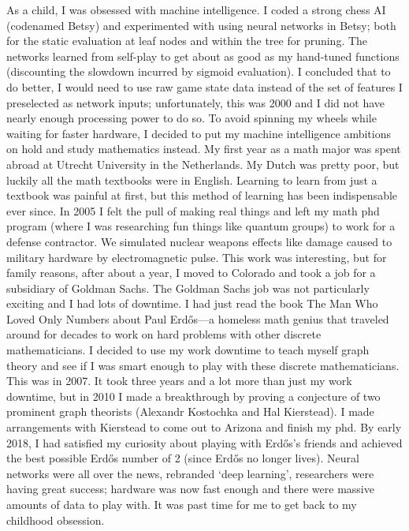 \documentclass{article}
\title{}
\author{Landon Rabern}
\begin{document}
\maketitle

As a child, I was obsessed with machine intelligence. I coded a strong chess AI (codenamed Betsy) and experimented with using neural networks in Betsy;
both for the static evaluation at leaf nodes and within the tree for pruning. 
The networks learned from self-play to get about as good as my hand-tuned functions (discounting the slowdown incurred by sigmoid evaluation). 
I concluded that to do better, I would need to use raw game state data instead of the set of features I preselected as network inputs; 
unfortunately, this was 2000 and I did not have nearly enough processing power to do so. 
To avoid spinning my wheels while waiting for faster hardware, I decided to put my machine intelligence ambitions on hold and 
study mathematics instead. My first year as a math major was spent abroad at Utrecht University in the Netherlands. My Dutch was pretty poor, 
but luckily all the math textbooks were in English. 
Learning to learn from just a textbook was painful at first, but this method of learning has been indispensable ever since. 
In 2005 I felt the pull of making real things and left my math phd program (where I was researching fun things like quantum groups) to work for a defense contractor. 
We simulated nuclear weapons effects like damage caused to military hardware by electromagnetic pulse. 
This work was interesting, but for family reasons, after about a year, I moved to Colorado and took a job for a subsidiary of Goldman Sachs.
The Goldman Sachs job was not particularly exciting and I had lots of downtime. 
I had just read the book The Man Who Loved Only Numbers about Paul Erdős---a homeless math genius that traveled around for decades to work on hard 
problems with other discrete mathematicians. I decided to use my work downtime to teach myself graph theory and see if I was smart enough to play 
with these discrete mathematicians. 
This was in 2007. It took three years and a lot more than just my work downtime, but in 2010 I made a breakthrough by proving a conjecture of two prominent graph theorists (Alexandr Kostochka and Hal Kierstead). I made arrangements with Kierstead to come out to Arizona and finish my phd. By early 2018, I had satisfied my curiosity about playing with Erdős's friends and achieved the best possible Erdős number of 2 (since Erdős no longer lives). 
Neural networks were all over the news, rebranded `deep learning', researchers were having great success; hardware was now fast enough and there were massive amounts of data to play with. It was past time for me to get back to my childhood obsession.
\end{document}
